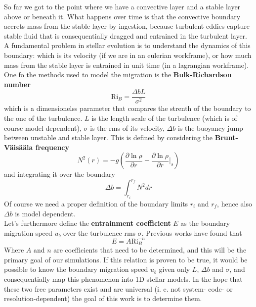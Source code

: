 \documentclass[11pt]{article}
\numberwithin{equation}{section}
\begin{document}
So far we got to the point where we have a convective layer and a stable layer above or beneath it. What happens over time is that the convective boundary accrets mass from the stable layer by ingestion, because turbulent eddies capture stable fluid that is consequentially dragged and entrained in the turbulent layer. A fundamental problem in stellar evolution is to understand the dynamics of this boundary: which is its velocity (if we are in an eulerian workframe), or how much mass from the stable layer is entrained in unit time (in a lagrangian workframe).\\
One fo the methods used to model the migration is the \textbf{Bulk-Richardson number}
\begin{equation}\label{bulkrichardson}
	\mathrm{Ri}_{B}=\frac{\Delta b L}{\sigma^2}
\end{equation}
which is a dimensionelss parameter that compares the strenth of the boundary to the one of the turbulence. $L$ is the length scale of the turbulence (which is of course model dependent), $\sigma$ is the rms of its velocity, $\Delta b$ is the buoyancy jump between unstable and stable layer. This is defined by considering the \textbf{Brunt-Väisääla frequency} 
\begin{equation}
	N^2(r)=-g \left (  \frac{\partial \ln \rho}{\partial r} -  \frac{\partial \ln \rho}{\partial r} \Big|_{s}  \right )
\end{equation}
and integrating it over the boundary
\begin{equation}
	\Delta b = \int_{r_i}^{r_f} N^2 dr
\end{equation}
Of course we need a proper definition of the boundary limits $r_i$ and $r_f$, hence also $\Delta b$ is model dependent. \\
Let's furthermore define the \textbf{entrainment coefficient} $E$ as the boundary migration speed $u_b$ over the turbulence rms $\sigma$. Previous works have found that
\begin{equation}
	E=A \mathrm{Ri}_{B}^{-n}
\end{equation}
Where $A$ and $n$ are coefficients that need to be determined, and this will be the primary goal of our simulations. If this relation is proven to be true, it would be possible to know the boundary migration speed $u_b$ given only $L$, $\Delta b$ and $\sigma$, and consequentially map this phenomenon into 1D stellar models. In the hope that these two free parameters exist and are universal (i. e. not system- code- or resolution-dependent) the goal of this work is to determine them.
\end{document}
